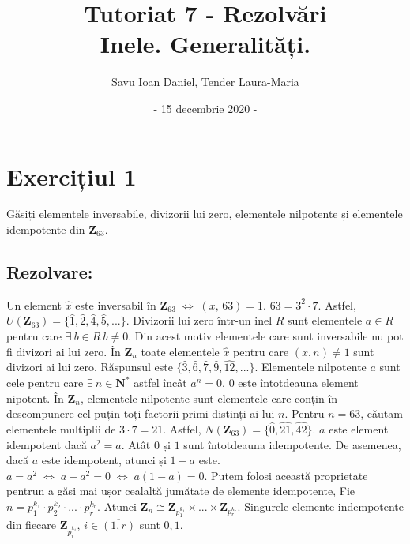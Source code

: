 \documentclass{article}
\title{Tutoriat 7 - Rezolvări \\
\Large  Inele. Generalități. }
\date{- 15 decembrie 2020 -}
\author{Savu Ioan Daniel, Tender Laura-Maria}
\DeclareRobustCommand\iff{\;\Longleftrightarrow\;}
\begin{document}
\maketitle
\section{Exercițiul 1}
Găsiți elementele inversabile, divizorii lui zero, elementele nilpotente și elementele idempotente din $\mathbf{Z}_{63}$.

\subsection {Rezolvare:}
Un element $\widehat{x}$ este inversabil în $\mathbf{Z}_{63} \iff (x, \, 63) = 1$. $63 = 3^2 \cdot 7$. Astfel, $U(\mathbf{Z}_{63}) = \{\widehat{1}, \widehat{2}, \widehat{4}, \widehat{5}, ... \}$.
\newline \newline
Divizorii lui zero într-un inel $R$ sunt elementele $a \in R$ pentru care $\exists \  b \in R \ b \neq 0$. Din acest motiv elementele care sunt inversabile nu pot fi divizori ai lui zero. 
\newline
În $\mathbf{Z}_{n}$ toate elementele $\widehat{x}$ pentru care $(x, n) \neq 1 $ sunt divizori ai lui zero. Răspunsul este $\{\widehat{3}, \widehat{6}, \widehat{7}, \widehat{9}, \widehat{12}, ...\}$.
\newline \newline
Elementele nilpotente $a$ sunt cele pentru care $\exists \ n \in \mathbf{N}^*$ astfel încât $a^n = 0$. $0$ este întotdeauna element nipotent.
În $\mathbf{Z}_{n}$, elementele nilpotente sunt elementele care conțin în descompunere cel puțin toți factorii primi distinți ai lui $n$. Pentru $n = 63$, căutam elementele multiplii de $3 \cdot 7 = 21$. Astfel, $N(\mathbf{Z}_{63}) = \{\widehat{0}, \widehat{21}, \widehat{42}\}$.
\newline \newline
$a$ este element idempotent dacă $a^2 = a$. Atât $0$ și $1$ sunt întotdeauna idempotente. De asemenea, dacă $a$ este idempotent, atunci și $1 - a$ este. $a = a^2 \iff a - a^2 = 0 \iff a(1 - a) = 0$. Putem folosi această proprietate pentrun a găsi mai ușor cealaltă jumătate de elemente idempotente,
\newline
Fie $n = p_1^{k_1} \cdot p_2^{k_2} \cdot ... \cdot  p_r^{k_r}$. Atunci $\mathbf{Z}_{n} \cong \mathbf{Z}_{p_1^{k_1}} \times ... \times \mathbf{Z}_{p_r^{k_r}}$. Singurele elemente indempotente din fiecare $\mathbf{Z}_{p_i^{k_i}}, \, i \in \overline{(1, r)}$  sunt $\overline{0}, \overline{1}$.
\end{document}
